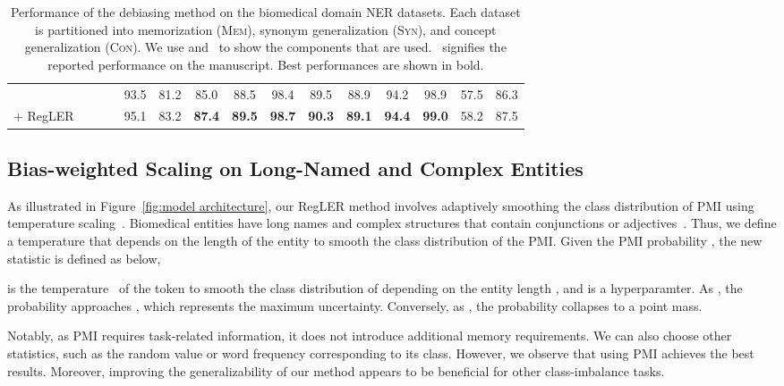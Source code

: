 \documentclass[11pt]{article}
\newcommand{\cmark}{\ding{51}}\newcommand{\xmark}{\ding{55}}\newcommand{\cross}{\ding{61}}\newcommand{\mb}[1]{\textcolor{red}{#1}}
\begin{document}
\begin{table*}[t]
\begin{adjustbox}{width=\textwidth}
\begin{tabular}{ l c c c c c c c | c c c c | c c c }
 & \xmark & \xmark & \xmark & 93.5 & 81.2 & 85.0 & 88.5 & 98.4 & 89.5 & 88.9 & 94.2 & 98.9 & 57.5 & 86.3 \\
 + RegLER & \cmark & \cmark & \cmark & 95.1 & 83.2 & \textbf{87.4} & \textbf{89.5} & \textbf{98.7} & \textbf{90.3} & \textbf{89.1} & \textbf{94.4} & \textbf{99.0} & 58.2 & 87.5 \\
\bottomrule
\end{tabular}
\end{adjustbox}
\caption{Performance of the debiasing method on the biomedical domain NER datasets. Each dataset is partitioned into memorization (\textsc{Mem}), synonym generalization (\textsc{Syn}), and concept generalization (\textsc{Con}). 
We use \cmark and \xmark ~to show the components that are used. \cross ~signifies the reported performance on the manuscript. Best performances are shown in bold.}
\label{tab:maintable 1}
\end{table*}


\subsection{Bias-weighted Scaling on Long-Named and Complex Entities}
\label{sec:scaling}
As illustrated in Figure~\ref{fig:model architecture}, our RegLER method involves adaptively smoothing the class distribution of PMI using temperature scaling~\cite{guo2017calibration}.
Biomedical entities have long names and complex structures that contain conjunctions or adjectives~\cite{wei2020multichannel,cho2020combinatorial}. 
Thus, we define a temperature  that depends on the length  of the entity to smooth the class distribution of the PMI.
Given the PMI probability , the new statistic is defined as below,



 is the temperature~\cite{guo2017calibration} of the token  to smooth the class distribution of  depending on the entity length , and  is a hyperparamter.
As , the probability  approaches , which represents the maximum uncertainty.
Conversely, as , the probability collapses to a point mass.

Notably, as PMI requires task-related information, it does not introduce additional memory requirements.
We can also choose other statistics, such as the random value or word frequency corresponding to its class.
However, we observe that using PMI achieves the best results.
Moreover, improving the generalizability of our method appears to be beneficial for other class-imbalance tasks.
\end{document}
